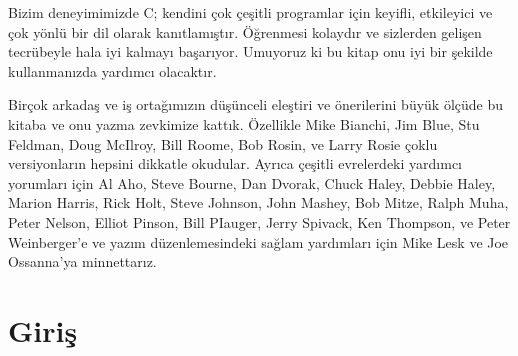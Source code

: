 \documentclass[a4paper,12pt,oneside]{book}
\begin{document}
\par Bizim deneyimimizde C; kendini çok çeşitli programlar için keyifli, etkileyici ve çok yönlü bir dil olarak kanıtlamıştır. Öğrenmesi kolaydır ve sizlerden gelişen tecrübeyle hala iyi kalmayı başarıyor. Umuyoruz ki bu kitap onu iyi bir şekilde kullanmanızda yardımcı olacaktır.
\thispagestyle{prefacetofe}
\par Birçok arkadaş ve iş ortağımızın düşünceli eleştiri ve önerilerini büyük ölçüde bu kitaba ve onu yazma zevkimize kattık. Özellikle Mike Bianchi, Jim Blue, Stu Feldman, Doug McIlroy, Bill Roome, Bob Rosin, ve Larry Rosie çoklu versiyonların hepsini dikkatle okudular. Ayrıca çeşitli evrelerdeki yardımcı yorumları için Al Aho, Steve Bourne, Dan Dvorak, Chuck Haley, Debbie Haley, Marion Harris, Rick Holt, Steve Johnson, John Mashey, Bob Mitze, Ralph Muha, Peter Nelson, Elliot Pinson, Bill PIauger, Jerry Spivack, Ken Thompson, ve Peter Weinberger'e ve yazım düzenlemesindeki sağlam yardımları için  Mike Lesk ve Joe Ossanna'ya minnettarız.

\noindent \hspace*{270pt}{Brian W. Kernighan \\}
\hspace*{280pt}{Dennis M. Ritchie}

\mainmatter

\chapter*{Giriş}
\end{document}
